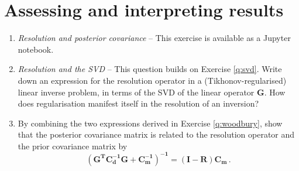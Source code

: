 \documentclass[a4paper,11pt]{article}
\begin{document}
 
\section{Assessing and interpreting results}
\begin{enumerate}[resume]
\item \textit{Resolution and posterior covariance} -- 
This exercise is available as a Jupyter notebook.
\item \textit{Resolution and the SVD} -- 
This question builds on Exercise \ref{q:svd}. Write down an expression for the resolution operator in a (Tikhonov-regularised) linear inverse problem, in terms of the SVD of the linear operator $\mathbf{G}$. How does regularisation manifest itself in the resolution of an inversion?
\item \label{q:rescov} By combining the two expressions derived in Exercise \ref{q:woodbury}, show that the posterior covariance matrix is related to the resolution operator and the prior covariance matrix by
\[\left(\mathbf{G^TC_d^{-1}G+C_m^{-1}}\right)^\mathbf{-1} = \left(\mathbf{I}-\mathbf{R}\right)\mathbf{C_m}\,.\]
\end{enumerate}


 
\end{document}

